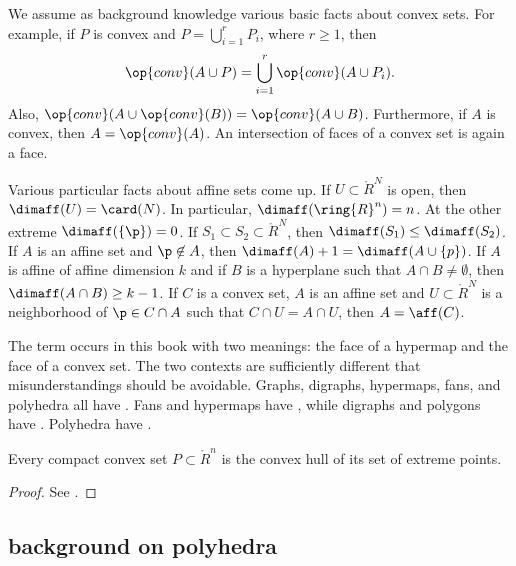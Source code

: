 \begin{remark}\label{rem:convex-background}
We  assume as background knowledge various basic facts about convex sets.
For example,
if $P$ is convex and $P = \bigcup_{i=1}^r P_i$, where $r\ge 1$, then
\[ 
\op{conv}(A\cup P ) = \bigcup_{i=1}^r\op{conv}(A\cup P_i).
\] 
Also, $\op{conv}(A\cup \op{conv}(B)) = \op{conv}(A \cup B)$.
Furthermore, if $A$ is convex, then $A = \op{conv}(A)$.
 An intersection of faces of a
convex set is again a face.
\end{remark}


\begin{remark}\label{rem:affine-background}
Various particular facts about affine sets  come up.
If $U\subset\ring{R}^N$ is open, then $\dimaff(U) = \card(N)$.  In particular,
$\dimaff(\ring{R}^n) = n$.  At the other extreme $\dimaff(\{\p\}) = 0$.
If $S_1\subset S_2\subset\ring{R}^N$, then $\dimaff(S_1) \le \dimaff(S_2)$.
If $A$ is an affine set and $\p\not\in A$, then $\dimaff(A) +1 = \dimaff(A\cup\{p\})$.
If $A$ is affine of affine dimension $k$ and if $B$ is a hyperplane such that $A\cap B\ne\emptyset$, then $\dimaff (A\cap B)\ge k-1$.
If $C$ is a convex set, $A$ is an affine set and $U\subset \ring{R}^N$ 
is a neighborhood of $\p\in C\cap A$ such that $C\cap U = A\cap U$, then
$A=\aff(C)$.
\end{remark}


\begin{remark}[polysemes]\label{remark:face} 
The term  occurs in this book with two meanings: the
face of a hypermap and the face of a convex set.  The two contexts
are sufficiently different that  misunderstandings should be avoidable.
Graphs, digraphs, hypermaps, fans, and polyhedra all have .
Fans and hypermaps have , while digraphs and polygons 
have .  Polyhedra have .
\end{remark}

\begin{lemma} Every compact
convex set $P\subset\ring{R}^n$ is the convex hull of its set of
extreme points.
\end{lemma}

\begin{proof}  See \cite[Theorem~2.6.16]{webster:1994}.
\end{proof}

\subsection{background on polyhedra}


